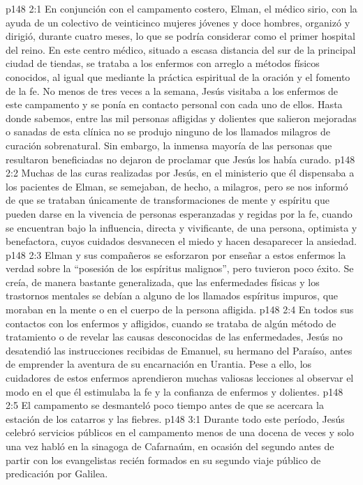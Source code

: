 \vs p148 2:1 En conjunción con el campamento costero, Elman, el médico sirio, con la ayuda de un colectivo de veinticinco mujeres jóvenes y doce hombres, organizó y dirigió, durante cuatro meses, lo que se podría considerar como el primer hospital del reino. En este centro médico, situado a escasa distancia del sur de la principal ciudad de tiendas, se trataba a los enfermos con arreglo a métodos físicos conocidos, al igual que mediante la práctica espiritual de la oración y el fomento de la fe. No menos de tres veces a la semana, Jesús visitaba a los enfermos de este campamento y se ponía en contacto personal con cada uno de ellos. Hasta donde sabemos, entre las mil personas afligidas y dolientes que salieron mejoradas o sanadas de esta clínica no se produjo ninguno de los llamados milagros de curación sobrenatural. Sin embargo, la inmensa mayoría de las personas que resultaron beneficiadas no dejaron de proclamar que Jesús los había curado.
\vs p148 2:2 Muchas de las curas realizadas por Jesús, en el ministerio que él dispensaba a los pacientes de Elman, se semejaban, de hecho, a milagros, pero se nos informó de que se trataban únicamente de transformaciones de mente y espíritu que pueden darse en la vivencia de personas esperanzadas y regidas por la fe, cuando se encuentran bajo la influencia, directa y vivificante, de una persona, optimista y benefactora, cuyos cuidados desvanecen el miedo y hacen desaparecer la ansiedad.
\vs p148 2:3 Elman y sus compañeros se esforzaron por enseñar a estos enfermos la verdad sobre la “posesión de los espíritus malignos”, pero tuvieron poco éxito. Se creía, de manera bastante generalizada, que las enfermedades físicas y los trastornos mentales se debían a alguno de los llamados espíritus impuros, que moraban en la mente o en el cuerpo de la persona afligida.
\vs p148 2:4 En todos sus contactos con los enfermos y afligidos, cuando se trataba de algún método de tratamiento o de revelar las causas desconocidas de las enfermedades, Jesús no desatendió las instrucciones recibidas de Emanuel, su hermano del Paraíso, antes de emprender la aventura de su encarnación en Urantia. Pese a ello, los cuidadores de estos enfermos aprendieron muchas valiosas lecciones al observar el modo en el que él estimulaba la fe y la confianza de enfermos y dolientes.
\vs p148 2:5 El campamento se desmanteló poco tiempo antes de que se acercara la estación de los catarros y las fiebres.
\vs p148 3:1 Durante todo este período, Jesús celebró servicios públicos en el campamento menos de una docena de veces y solo una vez habló en la sinagoga de Cafarnaúm, en ocasión del segundo  antes de partir con los evangelistas recién formados en su segundo viaje público de predicación por Galilea.
